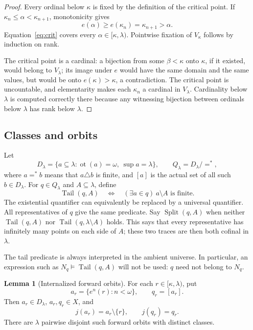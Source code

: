 \documentclass[11pt,letterpaper]{article}
\theoremstyle{definition}
\newtheorem{lemma}[definition]{Lemma}
\numberwithin{equation}{section}
\newcommand{\ot}{\operatorname{ot}}
\newcommand{\Tail}{\operatorname{Tail}}
\newcommand{\Split}{\operatorname{Split}}
\begin{document}
\begin{proof}
Every ordinal below $\kappa$ is fixed by the definition of the critical point. If $\kappa_n\le\alpha<\kappa_{n+1}$, monotonicity gives
\[
 e(\alpha)\ge e(\kappa_n)=\kappa_{n+1}>\alpha.
\]
Equation~\eqref{eq:crit} covers every $\alpha\in[\kappa,\lambda)$. Pointwise fixation of $V_\kappa$ follows by induction on rank.

The critical point is a cardinal: a bijection from some $\beta<\kappa$ onto $\kappa$, if it existed, would belong to $V_\lambda$; its image under $e$ would have the same domain and the same values, but would be onto $e(\kappa)>\kappa$, a contradiction. The critical point is uncountable, and elementarity makes each $\kappa_n$ a cardinal in $V_\lambda$. Cardinality below $\lambda$ is computed correctly there because any witnessing bijection between ordinals below $\lambda$ has rank below $\lambda$.
\end{proof}

\subsection{Classes and orbits}

Let
\[
 D_\lambda=\{a\subseteq\lambda:\ot(a)=\omega,\ \sup a=\lambda\},\qquad
 Q_\lambda=D_\lambda/{=^*},
\]
where $a=^*b$ means that $a\triangle b$ is finite, and $[a]$ is the actual set of all such $b\in D_\lambda$. For $q\in Q_\lambda$ and $A\subseteq\lambda$, define
\begin{equation}\label{eq:tail}
 \Tail(q,A)\quad\Longleftrightarrow\quad
   (\exists a\in q)\ a\setminus A\text{ is finite}.
\end{equation}
The existential quantifier can equivalently be replaced by a universal quantifier. All representatives of $q$ give the same predicate. Say $\Split(q,A)$ when neither $\Tail(q,A)$ nor $\Tail(q,\lambda\setminus A)$ holds. This says that every representative has infinitely many points on each side of $A$; these two traces are then both cofinal in $\lambda$.

The tail predicate is always interpreted in the ambient universe. In particular, an expression such as $N_q\models\Tail(q,A)$ will not be used: $q$ need not belong to $N_q$.

\begin{lemma}[Internalized forward orbits]\label{lem:orbits}
For each $r\in[\kappa,\lambda)$, put
\[
 a_r=\{e^n(r):n<\omega\},\qquad q_r=[a_r].
\]
Then $a_r\in D_\lambda$, $a_r,q_r\in X$, and
\begin{equation}\label{eq:shift}
 j(a_r)=a_r\setminus\{r\},\qquad j(q_r)=q_r.
\end{equation}
There are $\lambda$ pairwise disjoint such forward orbits with distinct classes.
\end{lemma}
\end{document}

